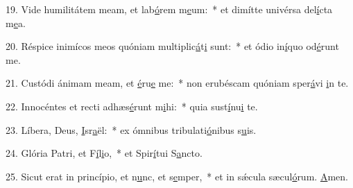 19. Vide humilitátem meam, et lab\uline{ó}rem m\uline{e}um:~* et dimítte univérsa del\uline{í}cta m\uline{e}a.\par 
20. Réspice inimícos meos quóniam multiplic\uline{á}t\uline{i} sunt:~* et ódio in\uline{í}quo od\uline{é}runt me.\par 
21. Custódi ánimam meam, et \uline{é}ru\uline{e} me:~* non erubéscam quóniam sper\uline{á}vi \uline{i}n te.\par 
22. Innocéntes et recti adhæs\uline{é}runt m\uline{i}hi:~* quia sust\uline{í}nu\uline{i} te.\par 
23. Líbera, Deus, \uline{I}sr\uline{a}ël:~* ex ómnibus tribulati\uline{ó}nibus s\uline{u}is.\par 
24. Glória Patri, et F\uline{í}l\uline{i}o,~* et Spir\uline{í}tui S\uline{a}ncto.\par 
25. Sicut erat in princípio, et n\uline{u}nc, et s\uline{e}mper,~* et in sǽcula sæcul\uline{ó}rum. \uline{A}men.\par 
